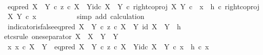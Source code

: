 \begin{isabellebody}
\ \ \ \ \ \ \isamarkupfalse%
\ \isamarkupfalse%
\ {\isachardoublequoteopen}{\isacharparenleft}{\kern0pt}{\isacharparenleft}{\kern0pt}eq{\isacharunderscore}{\kern0pt}pred\ {\isacharparenleft}{\kern0pt}X\ {\isasymCoprod}\ Y{\isacharparenright}{\kern0pt}\ {\isasymcirc}\isactrlsub c\ {\isasymlangle}z\ {\isasymcirc}\isactrlsub c\ {\isasymbeta}\isactrlbsub X\ {\isasymCoprod}\ Y\isactrlesub {\isacharcomma}{\kern0pt}id\isactrlsub c\ {\isacharparenleft}{\kern0pt}X\ {\isasymCoprod}\ Y{\isacharparenright}{\kern0pt}{\isasymrangle}{\isacharparenright}{\kern0pt}\ {\isasymcirc}\isactrlsub c\ right{\isacharunderscore}{\kern0pt}coproj\ X\ Y{\isacharparenright}{\kern0pt}\ {\isasymcirc}\isactrlsub c\ \ x\ {\isacharequal}{\kern0pt}\ {\isacharparenleft}{\kern0pt}h\ {\isasymcirc}\isactrlsub c\ right{\isacharunderscore}{\kern0pt}coproj\ X\ Y{\isacharparenright}{\kern0pt}\ {\isasymcirc}\isactrlsub c\ x{\isachardoublequoteclose}\isanewline
\ \ \ \ \ \ \ \ \ \isamarkupfalse%
\ {\isacharparenleft}{\kern0pt}simp\ add{\isacharcolon}{\kern0pt}\ calculation{\isacharparenright}{\kern0pt}\isanewline
\ \ \ \ \isamarkupfalse%
\isanewline
\ \ \isamarkupfalse%
\isanewline
\ \ \isamarkupfalse%
\ indicator{\isacharunderscore}{\kern0pt}is{\isacharunderscore}{\kern0pt}false{\isacharcolon}{\kern0pt}{\isachardoublequoteopen}eq{\isacharunderscore}{\kern0pt}pred\ {\isacharparenleft}{\kern0pt}X\ {\isasymCoprod}\ Y{\isacharparenright}{\kern0pt}\ {\isasymcirc}\isactrlsub c\ {\isasymlangle}z\ {\isasymcirc}\isactrlsub c\ {\isasymbeta}\isactrlbsub X\ {\isasymCoprod}\ Y\isactrlesub {\isacharcomma}{\kern0pt}\ id\ {\isacharparenleft}{\kern0pt}X\ {\isasymCoprod}\ Y{\isacharparenright}{\kern0pt}{\isasymrangle}\ {\isacharequal}{\kern0pt}\ h{\isachardoublequoteclose}\isanewline
\ \ \isamarkupfalse%
{\isacharparenleft}{\kern0pt}etcs{\isacharunderscore}{\kern0pt}rule\ one{\isacharunderscore}{\kern0pt}separator{\isacharbrackleft}{\kern0pt}\ X\ {\isacharequal}{\kern0pt}\ {\isachardoublequoteopen}X\ {\isasymCoprod}\ Y{\isachardoublequoteclose}{\isacharcomma}{\kern0pt}\ \ Y\ {\isacharequal}{\kern0pt}\ {\isasymOmega}{\isacharbrackright}{\kern0pt}{\isacharparenright}{\kern0pt}\isanewline
\ \ \ \ \isamarkupfalse%
\ {\isachardoublequoteopen}{\isasymAnd}x{\isachardot}{\kern0pt}\ x\ {\isasymin}\isactrlsub c\ X\ {\isasymCoprod}\ Y\ {\isasymLongrightarrow}\ {\isacharparenleft}{\kern0pt}eq{\isacharunderscore}{\kern0pt}pred\ {\isacharparenleft}{\kern0pt}X\ {\isasymCoprod}\ Y{\isacharparenright}{\kern0pt}\ {\isasymcirc}\isactrlsub c\ {\isasymlangle}z\ {\isasymcirc}\isactrlsub c\ {\isasymbeta}\isactrlbsub X\ {\isasymCoprod}\ Y\isactrlesub {\isacharcomma}{\kern0pt}id\isactrlsub c\ {\isacharparenleft}{\kern0pt}X\ {\isasymCoprod}\ Y{\isacharparenright}{\kern0pt}{\isasymrangle}{\isacharparenright}{\kern0pt}\ {\isasymcirc}\isactrlsub c\ x\ {\isacharequal}{\kern0pt}\ h\ {\isasymcirc}\isactrlsub c\ x{\isachardoublequoteclose}\isanewline

\end{isabellebody}
